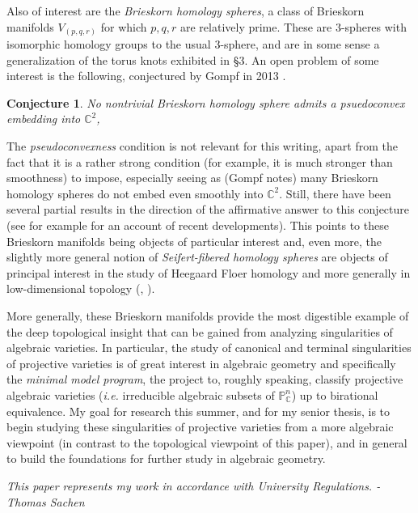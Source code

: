 \documentclass{article}
\newtheorem{conjecture}{Conjecture}[section]
\begin{document}
Also of interest are the \textit{Brieskorn homology spheres}, a class of Brieskorn manifolds $V_{(p,q,r)}$ for which $p,q,r$ are relatively prime. These are $3$-spheres with isomorphic homology groups to the usual $3$-sphere, and are in some sense a generalization of the torus knots exhibited in \S 3. An open problem of some interest is the following, conjectured by Gompf in 2013 \cite{gompf_2013}.
\begin{conjecture}
No nontrivial Brieskorn homology sphere admits a psuedoconvex embedding into $\mathbb{C}^2$,
\end{conjecture}
The \textit{pseudoconvexness} condition is not relevant for this writing, apart from the fact that it is a rather strong condition (for example, it is much stronger than smoothness) to impose, especially seeing as (Gompf notes) many Brieskorn homology spheres do not embed even smoothly into $\mathbb{C}^2$. Still, there have been several partial results in the direction of the affirmative answer to this conjecture (see for example \cite{mark_tosun_2018} for an account of recent developments). This points to these Brieskorn manifolds being objects of particular interest and, even more, the slightly more general notion of \textit{Seifert-fibered homology spheres} are objects of principal interest in the study of Heegaard Floer homology and more generally in low-dimensional topology (\cite{https://doi.org/10.48550/arxiv.2110.13405}, \cite{https://doi.org/10.48550/arxiv.0909.3975}).

More generally, these Brieskorn manifolds provide the most digestible example of the deep topological insight that can be gained from analyzing singularities of algebraic varieties. In particular, the study of canonical and terminal singularities of projective varieties is of great interest in algebraic geometry and specifically the \textit{minimal model program}, the project to, roughly speaking, classify projective algebraic varieties (\textit{i.e.} irreducible algebraic subsets of $\mathbb{P}^n_\mathbb{C}$) up to birational equivalence. My goal for research this summer, and for my senior thesis, is to begin studying these singularities of projective varieties from a more algebraic viewpoint (in contrast to the topological viewpoint of this paper), and in general to build the foundations for further study in algebraic geometry.


\newpage



\textit{This paper represents my work in accordance with University Regulations. -Thomas Sachen}
\end{document}
